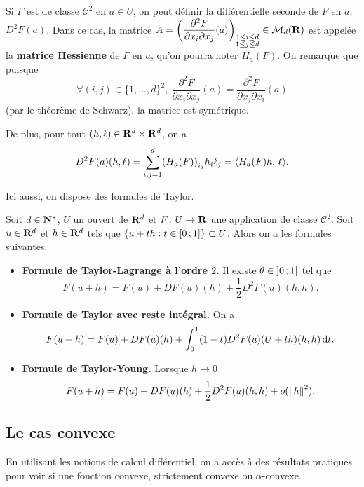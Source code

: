 \documentclass[grape]{../ceri/sty/MasterNotes}
\begin{document}
Si $F$ est de classe $\mathcal C^2$ en $a\in U$, on peut définir la différentielle seconde de $F$ en $a$, $D^2F(a)$. Dans ce cas, la matrice $\mi A =\displaystyle\left( \frac{\partial^2 F}{\partial x_i\partial x_j}(a) \right)_{\substack{1\le i\le d\\ 1\le j\le d}}\in\mathcal M_d(\R)$ est appelée la \textbf{matrice Hessienne} de $F$ en $a$, qu'on pourra noter $H_a(F)$. On remarque que puisque
\[ \forall (i,j)\in\{1,\ldots,d\}^2,\ \frac{\partial^2 F}{\partial x_i\partial x_j}(a) = \frac{\partial^2 F}{\partial x_j\partial x_i}(a) \]
(par le théorème de Schwarz), la matrice est symétrique.

De plus, pour tout $(h,\ell)\in\mathbf{R}^d\times\mathbf{R}^d$, on a
\[ D^2F(a)(h,\ell) = \sum_{i,j=1}^d\left( H_a(F) \right)_{ij}h_i\ell_j = \ps{H_a(F)h}{\ell}. \]

Ici aussi, on dispose des formules de Taylor.

\begin{propo}
    Soit $d\in\mathbf{N}^*$, $U$ un ouvert de $\mathbf{R}^d$ et $F\colon U\to\mathbf{R}$ une application de classe $\mathcal C^2$. Soit $u\in\mathbf{R}^d$ et $h\in\mathbf{R}^d$ tels que $\{u+th:t\in\intff01\}\subset U$. Alors on a les formules suivantes.
    \begin{itemize}
        \item \textnormal{\textbf{Formule de Taylor-Lagrange à l'ordre $2$.}} Il existe $\theta\in\intoo 01$ tel que
              \[ F(u+h) = F(u) + DF(u)(h) + \frac 12 D^2F(u)(h,h). \]
        \item \textnormal{\textbf{Formule de Taylor avec reste intégral.}} On a
              \[ F(u+h) = F(u) + DF(u)(h) + \int_0^1(1-t)D^2F(u)(U+th)(h,h)\mathop{}\mathopen{}\mathrm d t. \]
        \item \textnormal{\textbf{Formule de Taylor-Young.}} Lorsque $h\to 0$
              \[ F(u+h) = F(u) + DF(u)(h) + \frac 12 D^2F(u)(h,h) + o(\norme h^2). \]
    \end{itemize}
\end{propo}

\subsection{Le cas convexe}\label{1.6}

En utilisant les notions de calcul différentiel, on a accès à des résultats pratiques pour voir si une fonction convexe, strictement convexe ou $\alpha$-convexe.
\end{document}
